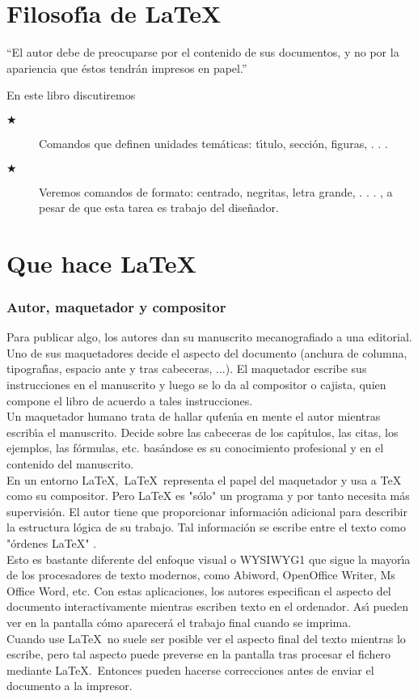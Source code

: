 \section{Filosof\'{\i}a de \LaTeX }

\textquotedblleft El autor debe de preocuparse por el contenido de sus
documentos, y no por la apariencia que \'{e}stos tendr\'{a}n impresos en
papel.\textquotedblright\

En este libro discutiremos 

\begin{description}
\item[$\bigstar$] Comandos que definen unidades tem\'{a}ticas: t\'{\i}tulo,
secci\'{o}n, figuras, . . .

\item[$\bigstar$] Veremos comandos de formato: centrado, negritas, letra grande, . . . \textexclamdown , a pesar de que esta tarea es trabajo  del dise\~{n}ador.
\end{description}
\section{Que hace \LaTeX}
\subsubsection{Autor, maquetador y compositor}
Para publicar algo, los autores dan su manuscrito mecanografiado a una editorial. Uno de sus maquetadores decide el aspecto del documento (anchura de columna, tipograf\'{\i}as, espacio ante y tras cabeceras, ...). El maquetador escribe sus instrucciones en el manuscrito y luego se lo da al compositor o cajista, quien compone el libro de acuerdo a tales instrucciones.\\
Un maquetador humano trata de hallar qu\' ten\'{\i}a en mente el autor
mientras escrib\'{\i}a el manuscrito. Decide sobre las cabeceras de los cap\'{\i}tulos, las citas, los ejemplos, las f\'ormulas, etc. bas\'andose es su conocimiento profesional y en el contenido del manuscrito.\\

En un entorno \LaTeX ,\, \LaTeX\, representa el papel del maquetador y usa a \TeX\, como su compositor. Pero \LaTeX{} es "s\'olo"  un programa y por tanto necesita m\'as supervisi\'on. El autor tiene que proporcionar informaci\'on adicional para describir la estructura l\'ogica de su trabajo. Tal informaci\'on se escribe entre el texto como "\'ordenes \LaTeX" .\\
Esto es bastante diferente del enfoque visual o WYSIWYG1 que sigue la mayor\'{\i}a de los procesadores de texto modernos, como Abiword, OpenOffice Writer, Ms Office Word, etc. Con estas aplicaciones, los autores especifican el aspecto del documento interactivamente mientras escriben texto en el ordenador. As\'{\i} pueden ver en la pantalla c\'omo aparecer\'a el trabajo final cuando se imprima.\\
Cuando use \LaTeX\, no suele ser posible ver el aspecto final del texto mientras lo escribe, pero tal aspecto puede preverse en la pantalla tras procesar el fichero mediante \LaTeX .\, Entonces pueden hacerse correcciones antes de enviar el documento a la impresor.
